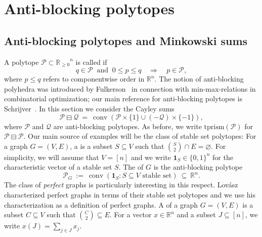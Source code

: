 \documentclass[11pt]{amsart}
\theoremstyle{definition}
\begin{document}
\section{Anti-blocking polytopes}
\label{sec:AB}

\subsection{Anti-blocking polytopes and Minkowski sums}
\label{ssec:AB_Minkowski}
A polytope ${\mathcal{P}} \subset {{\mathbb{R}}_{\ge0}}^n$ is called {\textbf{\color{black}{anti-blocking}}} if
\begin{equation}\label{eqn:antiblock}
    q \in {\mathcal{P}} \ \text{ and } \ 0 \le p \le q \quad \Longrightarrow \quad p \in
    {\mathcal{P}},
\end{equation}
where $p \le q$ refers to componentwise order in ${\mathbb{R}}^n$. The notion of
anti-blocking polyhedra was introduced by Fulkerson~\cite{Fulkerson} in
connection with min-max-relations in combinatorial optimization; our main
reference for anti-blocking polytopes is
Schrijver~\cite[Sect.~9.3]{Schrijver}. In this section we consider the Cayley
sums 
\[
    {{{\mathcal{P}} \boxminus {\mathcal{Q}}}} \ = \ \operatorname{conv}( {\mathcal{P}} \times \{1\} \cup (-{\mathcal{Q}}) \times \{-1\} ),
\]
where ${\mathcal{P}}$ and ${\mathcal{Q}}$ are anti-blocking polytopes. As before, we write
${\mathrm{tprism}({\mathcal{P}})}$ for ${{{\mathcal{P}} \boxminus {\mathcal{P}}}}$. Our main source of examples will be the class of
stable set polytopes: For a graph $G = (V,E)$, a {\textbf{\color{black}{stable set}}} is a subset
$S \subseteq V$ such that $\binom{S}{2} \cap E = {\varnothing}$. For simplicity,
we will assume that $V = [n]$ and we write ${\mathbf{1}}_S \in \{0,1\}^n$ for the
characteristic vector of a stable set $S$. The {\textbf{\color{black}{stable set polytope}}} of
$G$ is the anti-blocking polytope
\[
    {\mathcal{P}}_G \ := \ \operatorname{conv}( {\mathbf{1}}_S : S \subseteq V \text{ stable set} ) \ \subseteq \
    {\mathbb{R}}^n.
\]
The class of \emph{perfect} graphs is particularly interesting in this
respect. Lov\'{a}sz~\cite{Lovasz} characterized perfect graphs in terms of
their stable set polytopes and we use his characterization as a definition of
perfect graphs.  A {\textbf{\color{black}{clique}}} of a graph $G = (V,E)$ is a subset $C
\subseteq V$ such that $\binom{C}{2} \subseteq E$. For a vector $x \in {\mathbb{R}}^n$
and a subset $J \subseteq [n]$, we write $x(J) = \sum_{j \in J} x_j$.
\end{document}
